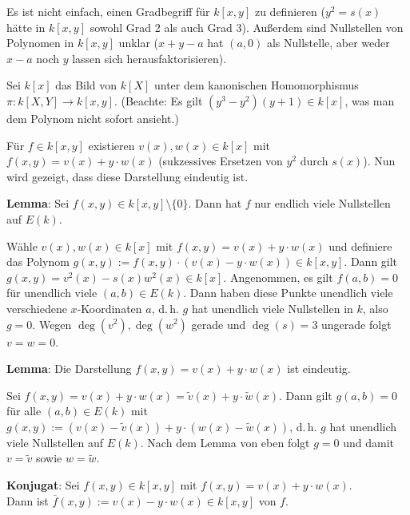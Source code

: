Es ist nicht einfach, einen Gradbegriff für $k[x, y]$ zu definieren
($y^2 = s(x)$ hätte in $k[x, y]$ sowohl Grad 2 als auch Grad 3).
Außerdem sind Nullstellen von Polynomen in $k[x, y]$ unklar
($x + y - a$ hat $(a, 0)$ als Nullstelle,
aber weder $x - a$ noch $y$ lassen sich herausfaktorisieren).

\linie

Sei $k[x]$ das Bild von $k[X]$ unter dem kanonischen Homomorphismus
$\pi\colon k[X, Y] \to k[x, y]$.
(Beachte: Es gilt $(y^3 - y^2)(y + 1) \in k[x]$, was man dem Polynom nicht sofort ansieht.)

Für $f \in k[x, y]$ existieren $v(x), w(x) \in k[x]$ mit $f(x, y) = v(x) + y \cdot w(x)$
(sukzessives Ersetzen von $y^2$ durch $s(x)$).
Nun wird gezeigt, dass diese Darstellung eindeutig ist.

\textbf{Lemma}:
Sei $f(x, y) \in k[x, y] \setminus \{0\}$.
Dann hat $f$ nur endlich viele Nullstellen auf $E(k)$.

\begin{Beweis}
    Wähle $v(x), w(x) \in k[x]$ mit $f(x, y) = v(x) + y \cdot w(x)$
    und definiere das Polynom $g(x, y) := f(x, y) \cdot (v(x) - y \cdot w(x)) \in k[x, y]$.
    Dann gilt $g(x, y) = v^2(x) - s(x) w^2(x) \in k[x]$.
    Angenommen, es gilt $f(a, b) = 0$ für unendlich viele $(a, b) \in E(k)$.
    Dann haben diese Punkte unendlich viele verschiedene $x$-Koordinaten $a$, d.\,h.
    $g$ hat unendlich viele Nullstellen in $k$, also $g = 0$.
    Wegen $\deg(v^2), \deg(w^2)$ gerade und $\deg(s) = 3$ ungerade folgt $v = w = 0$.
\end{Beweis}

\textbf{Lemma}:
Die Darstellung $f(x, y) = v(x) + y \cdot w(x)$ ist eindeutig.

\begin{Beweis}
    Sei $f(x, y) = v(x) + y \cdot w(x) = \widetilde{v}(x) + y \cdot \widetilde{w}(x)$.
    Dann gilt $g(a, b) = 0$ für alle $(a, b) \in E(k)$
    mit $g(x, y) := (v(x) - \widetilde{v}(x)) + y \cdot (w(x) - \widetilde{w}(x))$,
    d.\,h. $g$ hat unendlich viele Nullstellen auf $E(k)$.
    Nach dem Lemma von eben folgt $g = 0$ und damit $v = \widetilde{v}$ sowie $w = \widetilde{w}$.
\end{Beweis}

\linie

\textbf{Konjugat}:
Sei $f(x, y) \in k[x, y]$ mit $f(x, y) = v(x) + y \cdot w(x)$.\\
Dann ist $\overline{f}(x, y) := v(x) - y \cdot w(x) \in k[x, y]$  von $f$.

